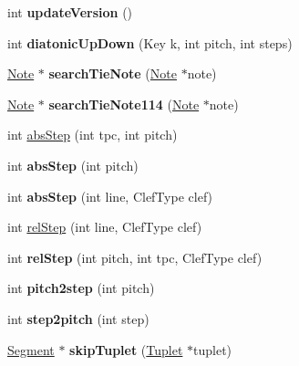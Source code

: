 \begin{DoxyCompactItemize}
int {\bfseries update\+Version} ()
\item 
\mbox{\label{namespace_ms_a13752d5bfd59442105dab763a659b7ba}} 
int {\bfseries diatonic\+Up\+Down} (Key k, int pitch, int steps)
\item 
\mbox{\label{namespace_ms_a7efd77a58797a375f3d6d631e51b204e}} 
\hyperlink{class_ms_1_1_note}{Note} $\ast$ {\bfseries search\+Tie\+Note} (\hyperlink{class_ms_1_1_note}{Note} $\ast$note)
\item 
\mbox{\label{namespace_ms_a53c7362a3d7031429624621b2753b8cf}} 
\hyperlink{class_ms_1_1_note}{Note} $\ast$ {\bfseries search\+Tie\+Note114} (\hyperlink{class_ms_1_1_note}{Note} $\ast$note)
\item 
int \hyperlink{namespace_ms_ae90e08f3e4159d323de2c12cd74865da}{abs\+Step} (int tpc, int pitch)
\item 
\mbox{\label{namespace_ms_a340882fc7a345682394e114713b71879}} 
int {\bfseries abs\+Step} (int pitch)
\item 
\mbox{\label{namespace_ms_a326ab3263c6554b6e0b109d83d0a3fa3}} 
int {\bfseries abs\+Step} (int line, Clef\+Type clef)
\item 
int \hyperlink{namespace_ms_a08a738e4e6bfb75a294f28c9b0fb9f2a}{rel\+Step} (int line, Clef\+Type clef)
\item 
\mbox{\label{namespace_ms_a042bce770c1b0ce55dfafc6cb36d0fce}} 
int {\bfseries rel\+Step} (int pitch, int tpc, Clef\+Type clef)
\item 
\mbox{\label{namespace_ms_a3783069f180d894b62de64d80313412e}} 
int {\bfseries pitch2step} (int pitch)
\item 
\mbox{\label{namespace_ms_a5547370f2a7050baacc35fa76c64edad}} 
int {\bfseries step2pitch} (int step)
\item 
\mbox{\label{namespace_ms_a103e7f94a3b2988cc87997138a84ee54}} 
\hyperlink{class_ms_1_1_segment}{Segment} $\ast$ {\bfseries skip\+Tuplet} (\hyperlink{class_ms_1_1_tuplet}{Tuplet} $\ast$tuplet)
\item 
\mbox{\label{namespace_ms_ad3c55a34a820e1ec7b3a978c3991510b}} 

\end{DoxyCompactItemize}
